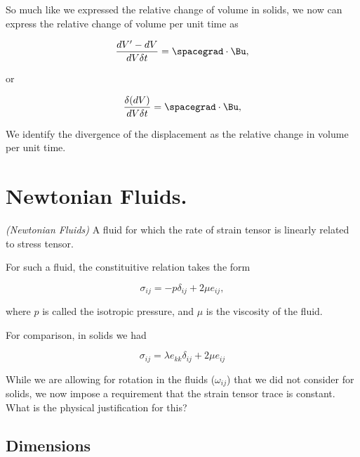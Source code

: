 So much like we expressed the relative change of volume in solids, we now can express the relative change of volume per unit time as

\begin{equation}\label{eqn:continuumL9:190}
\frac{dV' - dV}{dV \delta t} = \spacegrad \cdot \Bu,
\end{equation}

or

\begin{equation}\label{eqn:continuumL9:210}
\frac{\delta(dV)}{dV \delta t} = \spacegrad \cdot \Bu,
\end{equation}

We identify the divergence of the displacement as the relative change in volume per unit time.

\section{Newtonian Fluids.}

\begin{definition}
\emph{(Newtonian Fluids)}
\label{dfn:continuumL9:230}
A fluid for which the rate of strain tensor is linearly related to stress tensor.
\end{definition}

For such a fluid, the constituitive relation takes the form

\begin{equation}\label{eqn:continuumL9:250}
\boxed{
\sigma_{ij} = - p \delta_{ij} + 2 \mu e_{ij},
}
\end{equation}

where $p$ is called the isotropic pressure, and $\mu$ is the viscosity of the fluid.

For comparison, in solids we had

\begin{equation}\label{eqn:continuumL9:270}
\sigma_{ij} = \lambda e_{kk} \delta_{ij} + 2 \mu e_{ij}
\end{equation}

While we are allowing for rotation in the fluids ($\omega_{ij}$) that we did not consider for solids, we now impose a requirement that the strain tensor trace is constant.  What is the physical justification for this?

\subsection{Dimensions}

